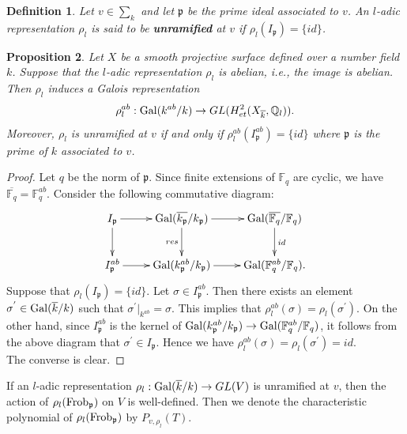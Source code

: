 \documentclass[reqno,a4paper,11pt]{amsart}
\newtheorem{dfn}{Definition}[section]
\newtheorem{prop}[dfn]{Proposition}
\theoremstyle{definition}
\theoremstyle{definition}
\begin{document}
\begin{dfn}
    Let $v\in \sum_{k}$ and let $\mathfrak{p}$ be the prime ideal associated to $v$. An $l$-adic representation $\rho_{l}$ is said to be \textbf{unramified} at $v$ if $\rho_{l}(I_{\mathfrak{p}})=\{id\}$.
\end{dfn}
\begin{prop}
    Let $X$ be a smooth projective surface defined over a number field $k$. Suppose that the $l$-adic representation $\rho_{l}$ is abelian, i.e., the image is abelian. Then $\rho_{l}$ induces a Galois representation
    \begin{align}
        \rho_{l}^{ab} : {\rm Gal}(k^{ab}/k)\to GL(H^{2}_{et}(X_{\overline{k}}, \mathbb{Q}_{l})).\notag
    \end{align}
    Moreover, $\rho_{l}$ is unramified at $v$ if and only if $\rho_{l}^{ab}(I^{ab}_{\mathfrak{p}})=\{id\}$ where $\mathfrak{p}$ is the prime of $k$ associated to $v$.
\end{prop}
\begin{proof}
    Let $q$ be the norm of $\mathfrak{p}$. Since  finite extensions of $\mathbb{F}_{q}$ are cyclic, we have $\overline{\mathbb{F}_{q}}=\mathbb{F}^{ab}_{q}$. Consider the following commutative diagram:
    \[\xymatrix{I_{\mathfrak{p}}\ar[r] \ar[d]&{\rm Gal}(\overline{k_{\mathfrak{p}}}/k_{\mathfrak{p}})\ar[r] \ar[d]_{res} & {\rm Gal}(\overline{\mathbb{F}_{q}}/\mathbb{F}_{q})\ar[d]^{id}
    \\ I_{\mathfrak{p}}^{ab}\ar[r] &{\rm Gal}(k^{ab}_{\mathfrak{p}}/k_{\mathfrak{p}})\ar[r] &  {\rm Gal}(\mathbb{F}^{ab}_{q}/\mathbb{F}_{q}).}\]
    Suppose that $\rho_{l}(I_{\mathfrak{p}})=\{id\}$. Let $\sigma \in I_{\mathfrak{p}}^{ab}$. Then there exists an element $\sigma^{'}\in {\rm Gal}(\overline{k}/k)$ such that $\sigma^{'}|_{k^{ab}}=\sigma$. This implies that  $\rho_{l}^{ab}(\sigma)=\rho_{l}(\sigma^{'})$. On the other hand, since $I^{ab}_{\mathfrak{p}}$ is the kernel of ${\rm Gal}(k^{ab}_{\mathfrak{p}}/k_{\mathfrak{p}})\to {\rm Gal}(\mathbb{F}_{q}^{ab}/\mathbb{F}_{q})$, it follows from the above diagram that $\sigma^{'}\in I_{\mathfrak{p}}$. Hence we have $\rho_{l}^{ab}(\sigma)=\rho_{l}(\sigma^{'})=id$.
    \\ The converse is clear.
\end{proof}
 If an $l$-adic representation $\rho_{l} : {\rm Gal}(\overline{k}/k)\to GL(V)$ is unramified at $v$, then the action of $\rho_{l}({\rm Frob}_{\mathfrak{p}})$ on $V$ is well-defined. Then we denote the characteristic polynomial of $\rho_{l}({\rm Frob}_{\mathfrak{p}})$ by $P_{v, \rho_{l}}(T)$.
\end{document}
